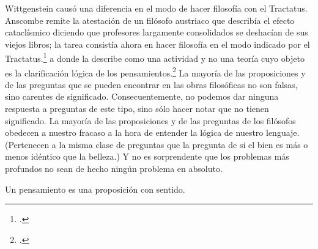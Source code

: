 \documentclass[../main.tex]{subfiles}
\begin{document}
Wittgenstein causó una diferencia en el modo de hacer filosofía con el Tractatus. Anscombe remite la atestación de un filósofo austriaco que describía el efecto cataclísmico diciendo que profesores largamente consolidados se deshacían de sus viejos libros; la tarea consistía ahora en hacer filosofía en el modo indicado por el Tractatus.\footcite[p.181]{twocuts}   a donde la describe como una actividad y no una teoría cuyo objeto es la clarificación lógica de los pensamientos.\footcite[4.112 p. 52]{tractatus}
La mayoría de las proposiciones y de las preguntas que se pueden encontrar en las obras filosóficas no son falsas, sino carentes de significado. Consecuentemente, no podemos dar ninguna respuesta a preguntas de este tipo, sino sólo hacer notar que no tienen significado. La mayoría de las proposiciones y de las preguntas de los filósofos obedecen a nuestro fracaso a la hora de entender la lógica de nuestro lenguaje. (Pertenecen a la misma clase de preguntas que la pregunta de si el bien es más o menos idéntico que la belleza.) Y no es sorprendente que los problemas más profundos no sean de hecho ningún problema en absoluto.

Un pensamiento es una proposición con sentido.
\end{document}
